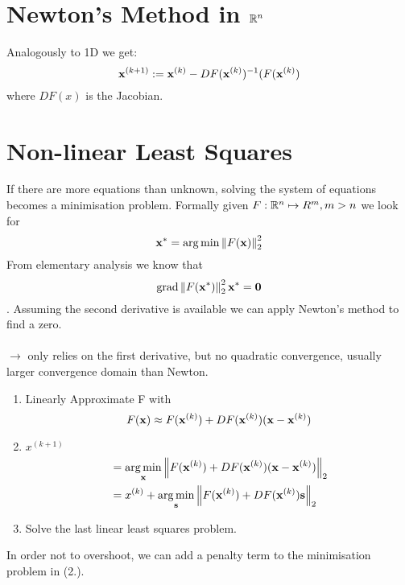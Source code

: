 \section{Newton's Method in $\mathbb{R}^n$}

\Method[Newton]
Analogously to 1D we get:
$$ \mathbf{x}^{(k+1)} := \mathbf{x}^{(k)} - DF(\mathbf{x}^{(k)})^{-1}(F(\mathbf{x}^{(k)})$$
where $DF(x)$ is the Jacobian.

\section{Non-linear Least Squares}

If there are more equations than unknown, solving the system of equations becomes a minimisation problem. Formally given $F: \mathbb{R}^n \mapsto R^m, m>n$ we look for
$$\mathbf{x}^{*} = \operatorname*{arg\,min} \left\lVert F(\mathbf{x}) \right\rVert_2^2$$
From elementary analysis we know that
$$\operatorname{grad} \left\lVert F(\mathbf{x}^{*}) \right\rVert_2^2 \mathbf{x}^{*} = \mathbf{0}$$.
Assuming the second derivative is available we can apply Newton's method to find a zero. \\

 \\
$\rightarrow$ only relies on the first derivative, but no quadratic convergence, usually larger convergence domain than Newton.
\begin{enumerate}
	\item Linearly Approximate F with $$F(\mathbf{x}) \approx F(\mathbf{x}^{(k)}) + DF(\mathbf{x}^{(k)})(\mathbf{x}-\mathbf{x}^{(k)})$$
	\item $x^{(k+1)}$
	\begin{align*}
		&= \operatorname*{arg\,min}_{\mathbf{x}} \left\lVert F(\mathbf{x}^{(k)}) + DF(\mathbf{x}^{(k)})(\mathbf{x}-\mathbf{x}^{(k)}) \right\rVert_2 \\
		&= x^{(k)} + \operatorname*{arg\,min}_{\mathbf{s}} \left\lVert F(\mathbf{x}^{(k)}) + DF(\mathbf{x}^{(k)})\mathbf{s} \right\rVert_2 
	\end{align*}
	\item Solve the last linear least squares problem.
\end{enumerate}
In order not to overshoot, we can add a penalty term to the minimisation problem in (2.).
 


\begin{comment}
## Preconditioning Newton's Method
-> Why does Newton converge well with linear function?


Write Differentiation Rules in Analysis Cheatsheet
Important Example: Inverse Matrix by Newton Iteration
- Simplified Newton, why does it work?

### Termination
Usually standard correction based termination, but we can try to get rid of the last needles step.
-> simplified termination


-> very good question: (Q8.7.1.9.B)

\end{comment}